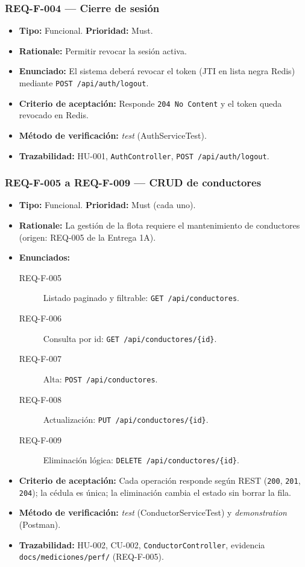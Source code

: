 \documentclass[12pt,a4paper]{article}
\begin{document}
\subsubsection{REQ-F-004 — Cierre de sesión}
\begin{itemize}
  \item \textbf{Tipo:} Funcional. \textbf{Prioridad:} Must.
  \item \textbf{Rationale:} Permitir revocar la sesión activa.
  \item \textbf{Enunciado:} El sistema deberá revocar el token (JTI en lista negra Redis)
  mediante \texttt{POST /api/auth/logout}.
  \item \textbf{Criterio de aceptación:} Responde \texttt{204 No Content} y el token queda
  revocado en Redis.
  \item \textbf{Método de verificación:} \textit{test} (AuthServiceTest).
  \item \textbf{Trazabilidad:} HU-001, \texttt{AuthController}, \texttt{POST /api/auth/logout}.
\end{itemize}

\subsubsection{REQ-F-005 a REQ-F-009 — CRUD de conductores}
\begin{itemize}
  \item \textbf{Tipo:} Funcional. \textbf{Prioridad:} Must (cada uno).
  \item \textbf{Rationale:} La gestión de la flota requiere el mantenimiento de conductores
  (origen: REQ-005 de la Entrega 1A).
  \item \textbf{Enunciados:}
    \begin{description}
      \item[REQ-F-005] Listado paginado y filtrable: \texttt{GET /api/conductores}.
      \item[REQ-F-006] Consulta por id: \texttt{GET /api/conductores/\{id\}}.
      \item[REQ-F-007] Alta: \texttt{POST /api/conductores}.
      \item[REQ-F-008] Actualización: \texttt{PUT /api/conductores/\{id\}}.
      \item[REQ-F-009] Eliminación lógica: \texttt{DELETE /api/conductores/\{id\}}.
    \end{description}
  \item \textbf{Criterio de aceptación:} Cada operación responde según REST (\texttt{200},
  \texttt{201}, \texttt{204}); la cédula es única; la eliminación cambia el estado sin borrar
  la fila.
  \item \textbf{Método de verificación:} \textit{test} (ConductorServiceTest) y
  \textit{demonstration} (Postman).
  \item \textbf{Trazabilidad:} HU-002, CU-002, \texttt{ConductorController},
  evidencia \texttt{docs/mediciones/perf/} (REQ-F-005).
\end{itemize}
\end{document}
